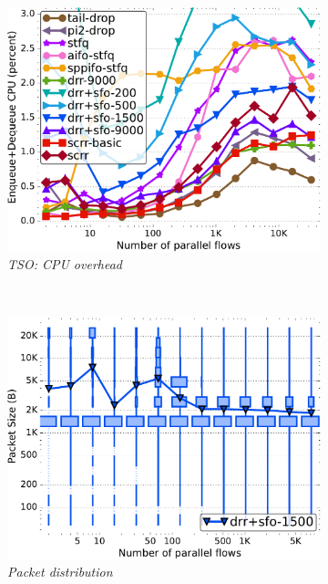 \begin{figure}[t]
\begin{subfigure}[t]{.30\linewidth}
    \centering
    \includegraphics[width=0.95\linewidth]{figs/paral_cn_1t16x1024_gso_kp_comp_methods.pdf}
    \caption{\small{\textit{TSO: CPU overhead}}}
    \label{fig:gso-cpu-full}
  \end{subfigure}
  \\
  \begin{subfigure}[t]{.30\linewidth}
    \centering
    \includegraphics[width=0.95\linewidth]{figs/paral_cn_1t4x1024_gro_pkthist_fq_drr_1500.pdf}
    \caption{\small{\textit{Packet distribution}}}
    \label{fig:gro-histo-full}
  \end{subfigure}
  \begin{subfigure}[t]{.30\linewidth}
    \centering

\end{subfigure}
\end{figure}

